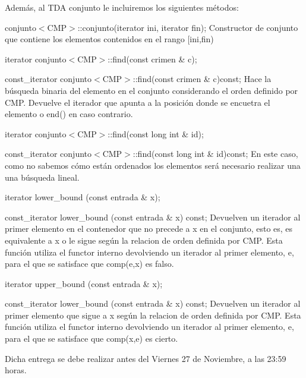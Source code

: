 Además, al T\+D\+A conjunto le incluiremos los siguientes métodos\+: \begin{DoxyItemize}
\item conjunto$<$\+C\+M\+P$>$\+::conjunto(iterator ini, iterator fin); Constructor de conjunto que contiene los elementos contenidos en el rango \mbox{[}ini,fin) \item iterator conjunto$<$\+C\+M\+P$>$\+::find(const crimen \& c); \item const\+\_\+iterator conjunto$<$\+C\+M\+P$>$\+::find(const crimen \& c)const; Hace la búsqueda binaria del elemento en el conjunto considerando el orden definido por C\+M\+P. Devuelve el iterador que apunta a la posición donde se encuetra el elemento o end() en caso contrario. \item iterator conjunto$<$\+C\+M\+P$>$\+::find(const long int \& id); \item const\+\_\+iterator conjunto$<$\+C\+M\+P$>$\+::find(const long int \& id)const; En este caso, como no sabemos cómo están ordenados los elementos será necesario realizar una una búsqueda lineal. \item iterator lower\+\_\+bound (const entrada \& x); \item const\+\_\+iterator lower\+\_\+bound (const entrada \& x) const; Devuelven un iterador al primer elemento en el contenedor que no precede a x en el conjunto, esto es, es equivalente a x o le sigue según la relacion de orden definida por C\+M\+P. Esta función utiliza el functor interno devolviendo un iterador al primer elemento, e, para el que se satisface que comp(e,x) es falso. \item iterator upper\+\_\+bound (const entrada \& x); \item const\+\_\+iterator lower\+\_\+bound (const entrada \& x) const; Devuelven un iterador al primer elemento que sigue a x según la relacion de orden definida por C\+M\+P. Esta función utiliza el functor interno devolviendo un iterador al primer elemento, e, para el que se satisface que comp(x,e) es cierto.\end{DoxyItemize}
Dicha entrega se debe realizar antes del Viernes 27 de Noviembre, a las 23\+:59 horas. 